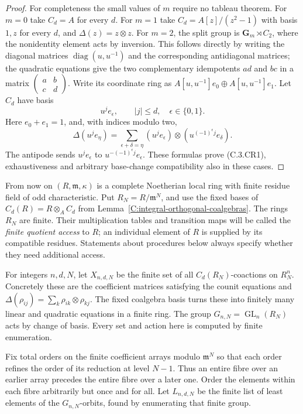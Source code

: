 \begin{proof}
For completeness the small values of $m$ require no
tableau theorem. For $m=0$ take $C_d=A$ for every $d$.
For $m=1$ take
$C_d=A[z]/(z^2-1)$ with basis $1,z$ for every $d$,
and $\Delta(z)=z\otimes z$.
For $m=2$, the split group is
$\mathbf G_m\rtimes C_2$, where the nonidentity element
acts by inversion. This follows directly by writing
the diagonal matrices $\operatorname{diag}(u,u^{-1})$
and the corresponding antidiagonal matrices; the
quadratic equations give the two complementary
idempotents $ad$ and $bc$ in a matrix
$\left(\begin{smallmatrix}a&b\\c&d\end{smallmatrix}\right)$.
Write its coordinate ring as
$A[u,u^{-1}]e_0\oplus A[u,u^{-1}]e_1$.
Let $C_d$ have basis
\[
           u^j e_\epsilon,\qquad |j|\leq d,\quad
                            \epsilon\in\{0,1\}.
\]
Here $e_0+e_1=1$, and, with indices modulo two,
\[
 \Delta(u^j e_\eta)=
 \sum_{\epsilon+\delta=\eta}
 (u^j e_\epsilon)\otimes
 (u^{(-1)^\epsilon j}e_\delta).
\]
The antipode sends $u^j e_\epsilon$ to
$u^{-(-1)^\epsilon j}e_\epsilon$.
These formulas prove (C.3.CR1), exhaustiveness and
arbitrary base-change compatibility also in these cases.
\end{proof}

From now on $(R,\mathfrak m,\kappa)$ is a complete Noetherian
local ring with finite residue field of odd characteristic.
Put $R_N=R/\mathfrak m^N$, and use the fixed bases of
$C_d(R)=R\otimes_A C_d$ from
Lemma~\ref{C:integral-orthogonal-coalgebras}.
The rings $R_N$ are finite. Their multiplication tables
and transition maps will be called the \emph{finite quotient
access} to $R$; an individual element of $R$ is supplied
by its compatible residues. Statements about procedures
below always specify whether they need additional access.

For integers $n,d,N$, let $X_{n,d,N}$ be the finite set
of all $C_d(R_N)$-coactions on $R_N^n$.
Concretely these are the coefficient matrices satisfying
the counit equations and
$\Delta(\rho_{ij})=\sum_k\rho_{ik}\otimes\rho_{kj}$.
The fixed coalgebra basis turns these into finitely many
linear and quadratic equations in a finite ring.
The group $G_{n,N}=\operatorname{GL}_n(R_N)$ acts by
change of basis. Every set and action here is computed
by finite enumeration.

Fix total orders on the finite coefficient arrays modulo
$\mathfrak m^N$ so that each order refines the order of
its reduction at level $N-1$. Thus an entire fibre over
an earlier array precedes the entire fibre over a later
one. Order the elements within each fibre arbitrarily
but once and for all. Let $L_{n,d,N}$ be the finite list
of least elements of the $G_{n,N}$-orbits, found by
enumerating that finite group.

